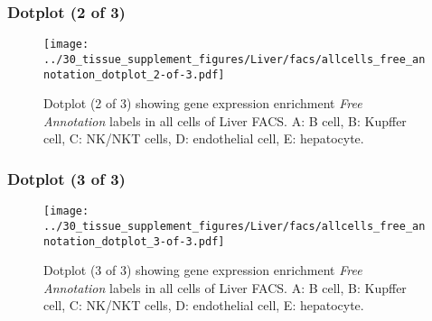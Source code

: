 \clearpage

\subsubsection{Dotplot (2 of 3)}
\begin{figure}[h]
\centering
\texttt{[image: ../30\_tissue\_supplement\_figures/Liver/facs/allcells\_free\_annotation\_dotplot\_2-of-3.pdf]}

\caption{ Dotplot (2 of 3)  showing gene expression enrichment \emph{Free Annotation} labels in all cells of Liver FACS. A: B cell, B: Kupffer cell, C: NK/NKT cells, D: endothelial cell, E: hepatocyte.}
\end{figure}


\clearpage

\subsubsection{Dotplot (3 of 3)}
\begin{figure}[h]
\centering
\texttt{[image: ../30\_tissue\_supplement\_figures/Liver/facs/allcells\_free\_annotation\_dotplot\_3-of-3.pdf]}

\caption{ Dotplot (3 of 3)  showing gene expression enrichment \emph{Free Annotation} labels in all cells of Liver FACS. A: B cell, B: Kupffer cell, C: NK/NKT cells, D: endothelial cell, E: hepatocyte.}
\end{figure}

